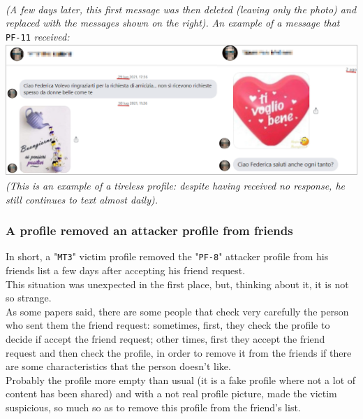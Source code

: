\textit{\\(A few days later, this first message was then deleted (leaving only the photo) and replaced with the messages shown on the right).}\newpage
\quad \textit{An example of a message that }\texttt{PF-11}\textit{ received:}\\
\includegraphics[height=5cm]{immagini/pf-11.png}
\textit{\\(This is an example of a tireless profile: despite having received no response, he still continues to text almost daily).}
\subsubsection*{A profile removed an attacker profile from friends}
\label{cap:discuss-removed-friends}
In short, a "\texttt{MT3}" victim profile removed the "\texttt{PF-8}" attacker profile from his friends list a few days after accepting his friend request.\\ 
This situation was unexpected in the first place, but, thinking about it, it is not so strange.\\As some papers said, there are some people that check very carefully the person who sent them the friend request: sometimes, first, they check the profile to decide if accept the friend request; other times, first they accept the friend request and then check the profile, in order to remove it from the friends if there are some characteristics that the person doesn't like.\\
Probably the profile more empty than usual (it is a fake profile where not a lot of content has been shared) and with a not real profile picture, made the victim suspicious, so much so as to remove this profile from the friend's list.
